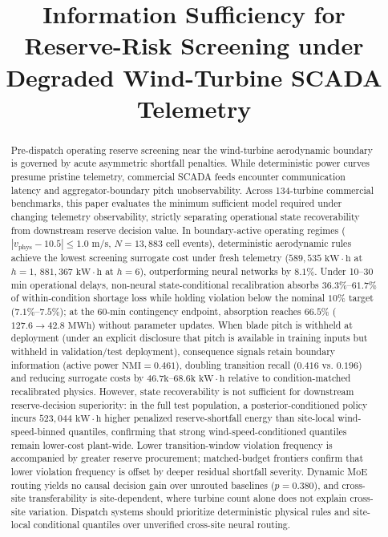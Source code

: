 \documentclass[
  journal]{IEEEtran}
\author{}
\date{}
\begin{document}
\title{Information Sufficiency for Reserve-Risk Screening under Degraded Wind-Turbine SCADA Telemetry}

\author{%
}

\maketitle

\begin{abstract}
Pre-dispatch operating reserve screening near the wind-turbine aerodynamic boundary is governed by acute asymmetric shortfall penalties. While deterministic power curves presume pristine telemetry, commercial SCADA feeds encounter communication latency and aggregator-boundary pitch unobservability. Across 134-turbine commercial benchmarks, this paper evaluates the minimum sufficient model required under changing telemetry observability, strictly separating operational state recoverability from downstream reserve decision value. In boundary-active operating regimes ($|v_{\text{phys}}-10.5|\le 1.0\text{ m/s}$, $N=13{,}883$ cell events), deterministic aerodynamic rules achieve the lowest screening surrogate cost under fresh telemetry ($589{,}535\text{ kW}\cdot\text{h}$ at $h=1$, $881{,}367\text{ kW}\cdot\text{h}$ at $h=6$), outperforming neural networks by $8.1\%$. Under 10--30 min operational delays, non-neural state-conditional recalibration absorbs $36.3\%$--$61.7\%$ of within-condition shortage loss while holding violation below the nominal $10\%$ target ($7.1\%$--$7.5\%$); at the 60-min contingency endpoint, absorption reaches $66.5\%$ ($127.6 \to 42.8\text{ MWh}$) without parameter updates. When blade pitch is withheld at deployment (under an explicit disclosure that pitch is available in training inputs but withheld in validation/test deployment), consequence signals retain boundary information (active power $\text{NMI}=0.461$), doubling transition recall ($0.416$ vs. $0.196$) and reducing surrogate costs by $46.7\text{k}\text{--}68.6\text{k}\text{ kW}\cdot\text{h}$ relative to condition-matched recalibrated physics. However, state recoverability is not sufficient for downstream reserve-decision superiority: in the full test population, a posterior-conditioned policy incurs $523{,}044\text{ kW}\cdot\text{h}$ higher penalized reserve-shortfall energy than site-local wind-speed-binned quantiles, confirming that strong wind-speed-conditioned quantiles remain lower-cost plant-wide. Lower transition-window violation frequency is accompanied by greater reserve procurement; matched-budget frontiers confirm that lower violation frequency is offset by deeper residual shortfall severity. Dynamic MoE routing yields no causal decision gain over unrouted baselines ($p=0.380$), and cross-site transferability is site-dependent, where turbine count alone does not explain cross-site variation. Dispatch systems should prioritize deterministic physical rules and site-local conditional quantiles over unverified cross-site neural routing.

\end{abstract}
\end{document}
